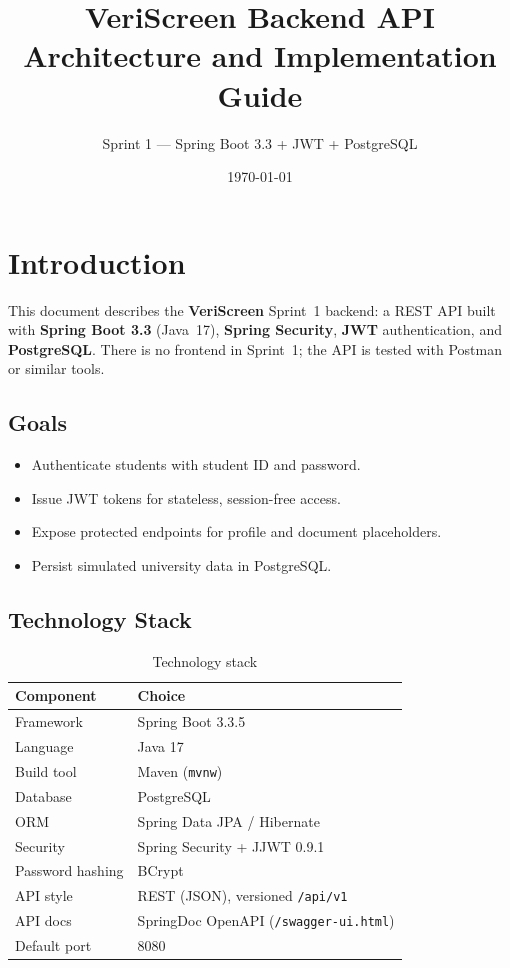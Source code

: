 \documentclass[11pt,a4paper]{article}
\title{VeriScreen Backend API\\Architecture and Implementation Guide}
\author{Sprint 1 --- Spring Boot 3.3 + JWT + PostgreSQL}
\date{\today}
\begin{document}
\maketitle
\tableofcontents
\newpage

\section{Introduction}

This document describes the \textbf{VeriScreen} Sprint~1 backend: a REST API built with \textbf{Spring Boot 3.3} (Java~17), \textbf{Spring Security}, \textbf{JWT} authentication, and \textbf{PostgreSQL}. There is no frontend in Sprint~1; the API is tested with Postman or similar tools.

\subsection{Goals}

\begin{itemize}[noitemsep]
    \item Authenticate students with student ID and password.
    \item Issue JWT tokens for stateless, session-free access.
    \item Expose protected endpoints for profile and document placeholders.
    \item Persist simulated university data in PostgreSQL.
\end{itemize}

\subsection{Technology Stack}

\begin{table}[h]
\centering
\begin{tabular}{@{}ll@{}}
\toprule
\textbf{Component} & \textbf{Choice} \\
\midrule
Framework       & Spring Boot 3.3.5 \\
Language        & Java 17 \\
Build tool      & Maven (\texttt{mvnw}) \\
Database        & PostgreSQL \\
ORM             & Spring Data JPA / Hibernate \\
Security        & Spring Security + JJWT 0.9.1 \\
Password hashing& BCrypt \\
API style       & REST (JSON), versioned \texttt{/api/v1} \\
API docs        & SpringDoc OpenAPI (\texttt{/swagger-ui.html}) \\
Default port    & 8080 \\
\bottomrule
\end{tabular}
\caption{Technology stack}
\end{table}
\end{document}
